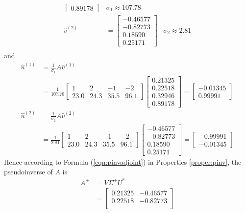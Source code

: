 \begin{solution}
\begin{align*}
\begin{bmatrix}
0.89178
\end{bmatrix}
& \sigma_1 \approx 107.78 \\
\hat{v}^{(2)} &= 
\begin{bmatrix}
-0.46577 \\
-0.82773 \\
0.18590 \\
0.25171
\end{bmatrix}
& \sigma_2 \approx 2.81 \\
\end{align*}
and
\begin{align*}
\hat{u}^{(1)} &= \frac{1}{\sigma_1} A\hat{v}^{(1)} \\
&= \frac{1}{107.78} \begin{bmatrix}
1 & 2 & -1 & -2 \\
23.0 & 24.3 & 35.5 & 96.1    
\end{bmatrix}
\begin{bmatrix}
0.21325 \\
0.22518 \\  
0.32946 \\
0.89178
\end{bmatrix} = 
\begin{bmatrix}
-0.01345 \\
0.99991
\end{bmatrix} \\
\hat{u}^{(2)} &= \frac{1}{\sigma_2} A\hat{v}^{(2)} \\
&= \frac{1}{2.81} \begin{bmatrix}
1 & 2 & -1 & -2 \\
23.0 & 24.3 & 35.5 & 96.1    
\end{bmatrix}
\begin{bmatrix}
-0.46577 \\
-0.82773 \\
0.18590 \\
0.25171
\end{bmatrix} = 
\begin{bmatrix}
-0.99991 \\
-0.01345
\end{bmatrix}
\end{align*}
Hence according to Formula (\ref{eqn:pinvadjoint}) in Properties \ref{proper:pinv}, the pseudoinverse of $A$ is
\begin{align*}
A^+ &= V\Sigma^+ U^* \\
&= 
\begin{bmatrix}
0.21325 & -0.46577 \\
0.22518 & -0.82773 \\  

\end{bmatrix}
\end{align*}
\end{solution}
